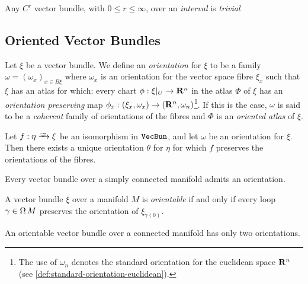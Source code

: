 \documentclass[../../../deep-dive]{subfile}
\begin{document}
\begin{corollary}
\label{cor:smooth-vector-bundle-over-interval-is-trivial}
Any \(C^r\) vector bundle, with \(0 \leq r \leq \infty\), over an
\emph{interval} is \emph{trivial}
\end{corollary}

\subsection{Oriented Vector Bundles}

\begin{definition}
\label{def:orientation-vector-bundle}
Let \(\xi\) be a vector bundle. We define an \emph{orientation} for \(\xi\) to
be a family \(\omega = (\omega_x)_{x \in B \xi}\) where \(\omega_x\) is an
orientation for the vector space fibre \(\xi_x\) such that \(\xi\) has an atlas
for which: every chart \(\phi: \xi|_U \to \mathbf{R}^n\) in the atlas \(\Phi\) of
\(\xi\) has an \emph{orientation preserving} map
\(\phi_x: (\xi_x, \omega_x) \to (\mathbf{R}^n, \omega_n)\)\footnote{The use of
  \(\omega_n\) denotes the standard orientation for the euclidean space \(\mathbf{R}^n\)
  (see \cref{def:standard-orientation-euclidean}).}. If this is the case,
\(\omega\) is said to be a \emph{coherent} family of orientations of the fibres
and \(\Phi\) is an \emph{oriented atlas} of \(\xi\).
\end{definition}

\begin{lemma}
\label{lem:unique-orientation-from-vector-bundle-isomorphism}
Let \(f: \eta \isoto \xi\) be an isomorphism in \({\texttt{VecBun}}\), and let \(\omega\)
be an orientation for \(\xi\). Then there exists a unique orientation \(\theta\)
for \(\eta\) for which \(f\) preserves the orientations of the fibres.
\end{lemma}

\begin{proposition}
\label{thm:simply-connected-manifold-admits-orientation}
Every vector bundle over a simply connected manifold admits an orientation.
\end{proposition}

\begin{proposition}
\label{prop:vecbun-orientable-iff-loop-preserves-orientation}
A vector bundle \(\xi\) over a manifold \(M\) is \emph{orientable} if and only
if every loop \(\gamma \in \operatorname{\Omega} M\) preserves the orientation of
\(\xi_{\gamma(0)}\).
\end{proposition}

\begin{corollary}
\label{cor:orientable-vecbun-connected-manifold-2-orientations}
An orientable vector bundle over a connected manifold has only two orientations.
\end{corollary}
\end{document}

